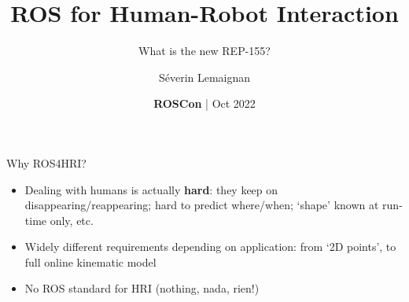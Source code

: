 \documentclass[xcolor=table,aspectratio=169]{beamer}
\title{\Large ROS for Human-Robot Interaction}
\subtitle{What is the new REP-155?}
\date{{\bf ROSCon} | Oct 2022}
\author{Séverin Lemaignan}
\institute{{\bf PAL Robotics} Senior Scientist AI \& Social Interactions}
\begin{document}




\maketitle
{}


%
%
%
%

{
\begin{frame}{Why ROS4HRI?}

    \begin{itemize}
        \item<+->  Dealing with humans is actually \textbf{hard}: they keep on
            disappearing/reappearing; hard to predict where/when; `shape' known
            at run-time only, etc.

        \item<+-> Widely different requirements depending on application: from
            `2D points', to full online kinematic model

        \item<+-> No ROS standard for HRI (nothing, nada, rien!)
    \end{itemize}

\end{frame}
}
\end{document}
